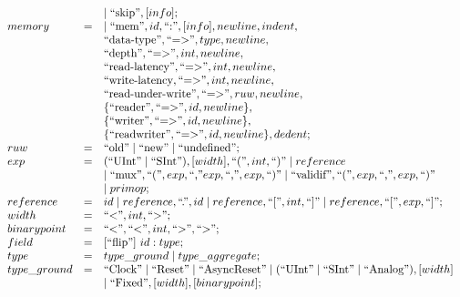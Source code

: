 {\begin{figure}[t]
{\[\begin{array}{l l l}
&   &\mid \mbox{``skip''}, [info];\\ 
%
memory & = &  \mid  \mbox{``mem''}, id, \mbox{``:''}, [info], newline, indent, \\
 & & \mbox{``data-type''}, \mbox{``=>''}, type, newline, \\
 & & \mbox{``depth''}, \mbox{``=>''}, int, newline, \\
 & & \mbox{``read-latency''}, \mbox{``=>''}, int, newline, \\ 
 & & \mbox{``write-latency}, \mbox{``=>''}, int, newline,  \\
 & & \mbox{``read-under-write''}, \mbox{``=>''}, ruw, newline, \\
  & & \{\mbox{``reader''}, \mbox{``=>''}, id, newline\}, \\
  & & \{\mbox{``writer''}, \mbox{``=>''}, id, newline\}, \\
  & & \{\mbox{``readwriter''}, \mbox{``=>''}, id, newline\}, dedent;\\    
%
ruw & = & \mbox{``old''} \mid \mbox{``new''} \mid \mbox{``undefined''};\\
%
exp & = & (\mbox{``UInt''} \mid \mbox{``SInt''}), [width], \mbox{``(''}, int, \mbox{``)''} \mid reference \\
& & \mid  \mbox{``mux''}, \mbox{``(''}, exp, \mbox{``,''} exp, \mbox{``,''}, exp, \mbox{``)''} \mid \mbox{``validif''}, \mbox{``(''}, exp, \mbox{``,''}, exp, \mbox{``)''}\\
& & \mid primop;\\
%
reference & = & id \mid reference, \mbox{``.''}, id \mid reference, \mbox{``[''}, int, \mbox{``]''} \mid reference, \mbox{``[''}, exp, \mbox{``]''};\\
%
width & = & \mbox{``<''}, int, \mbox{``>''};\\
%
binarypoint & = & \mbox{``<''}, \mbox{``<''}, int, \mbox{``>''}, \mbox{``>''};\\
%
 field & = & [\mbox{``flip''}]\ id: type;\\
%
type & = & type\_ground \mid type\_aggregate; \\
 type\_ground & = &  \mbox{``Clock''} \mid \mbox{``Reset''} \mid \mbox{``AsyncReset''} \mid (\mbox{``UInt''} \mid \mbox{``SInt''}  \mid \mbox{``Analog''}), [width]  \\
 & & \mid \mbox{``Fixed''}, [width], [binarypoint];\\

\end{array}\]}
\end{figure}}
